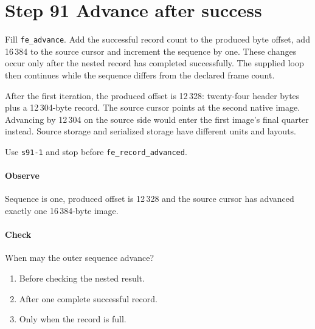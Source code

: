 \section{Step 91 Advance after success}
Fill \texttt{fe\_advance}. Add the successful record count to the produced byte offset, add 16\,384 to the source cursor and increment the sequence by one. These changes occur only after the nested record has completed successfully. The supplied loop then continues while the sequence differs from the declared frame count.

After the first iteration, the produced offset is 12\,328: twenty-four header bytes plus a 12\,304-byte record. The source cursor points at the second native image. Advancing by 12\,304 on the source side would enter the first image's final quarter instead. Source storage and serialized storage have different units and layouts.

Use \texttt{s91-1} and stop before \texttt{fe\_record\_advanced}.

\paragraph{Observe} Sequence is one, produced offset is 12\,328 and the source cursor has advanced exactly one 16\,384-byte image.

\paragraph{Check} When may the outer sequence advance?
\begin{enumerate}[label=\Alph*.]
\item Before checking the nested result.
\item After one complete successful record.
\item Only when the record is full.
\end{enumerate}
